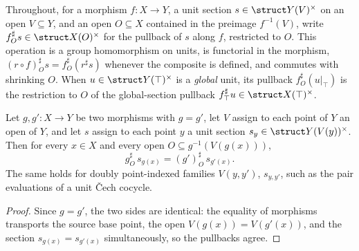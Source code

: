 Throughout, for a morphism \(f \colon X \to Y\), a unit section \(s \in \struct Y(V)^{\times}\)
on an open \(V \subseteq Y\), and an open \(O \subseteq X\) contained in the preimage
\(f^{-1}(V)\), write \(f^{\sharp}_O s \in \struct X(O)^{\times}\) for the pullback of \(s\)
along \(f\), restricted to \(O\). This operation is a group homomorphism on units, is
functorial in the morphism, \((r \circ f)^{\sharp}_O s = f^{\sharp}_O (r^{\sharp} s)\) whenever
the composite is defined, and commutes with shrinking \(O\). When \(u \in \struct Y(\top)^{\times}\)
is a \emph{global} unit, its pullback \(f^{\sharp}_O(u|_\top)\) is the restriction to \(O\) of
the global-section pullback \(f^{\sharp}_\top u \in \struct X(\top)^{\times}\).

\begin{lemma}
  \label{lem:unitsAppLE_congr_hom}
  \leanok
  Let \(g, g' \colon X \to Y\) be two morphisms with \(g = g'\), let \(V\) assign to each point
  of \(Y\) an open of \(Y\), and let \(s\) assign to each point \(y\) a unit section
  \(s_y \in \struct Y(V(y))^{\times}\). Then for every \(x \in X\) and every open
  \(O \subseteq g^{-1}(V(g(x)))\),
  \[
    g^{\sharp}_O\, s_{g(x)} = (g')^{\sharp}_O\, s_{g'(x)} .
  \]
  The same holds for doubly point-indexed families \(V(y,y')\), \(s_{y,y'}\), such as the
  pair evaluations of a unit \v Cech cocycle.
\end{lemma}
\begin{proof}
  \leanok
  Since \(g = g'\), the two sides are identical: the equality of morphisms transports the
  source base point, the open \(V(g(x)) = V(g'(x))\), and the section
  \(s_{g(x)} = s_{g'(x)}\) simultaneously, so the pullbacks agree.
\end{proof}


